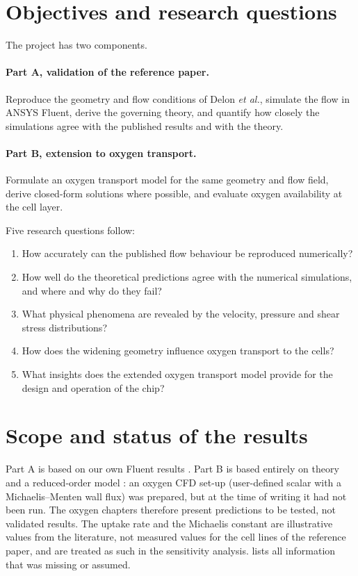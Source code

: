 \section{Objectives and research questions}

The project has two components.

\paragraph{Part A, validation of the reference paper.} Reproduce the geometry and flow conditions of Delon \emph{et al.}, simulate the flow in ANSYS Fluent, derive the governing theory, and quantify how closely the simulations agree with the published results and with the theory.

\paragraph{Part B, extension to oxygen transport.} Formulate an oxygen transport model for the same geometry and flow field, derive closed-form solutions where possible, and evaluate oxygen availability at the cell layer.

\noindent Five research questions follow:
\begin{enumerate}[label=\textbf{RQ\arabic*}]
\item How accurately can the published flow behaviour be reproduced numerically?
\item How well do the theoretical predictions agree with the numerical simulations, and where and why do they fail?
\item What physical phenomena are revealed by the velocity, pressure and shear stress distributions?
\item How does the widening geometry influence oxygen transport to the cells?
\item What insights does the extended oxygen transport model provide for the design and operation of the chip?
\end{enumerate}

\section{Scope and status of the results}

Part A is based on our own Fluent results \tagC. Part B is based entirely on theory and a reduced-order model \tagM: an oxygen CFD set-up (user-defined scalar with a Michaelis--Menten wall flux) was prepared, but at the time of writing it had not been run. The oxygen chapters therefore present predictions to be tested, not validated results. The uptake rate and the Michaelis constant are illustrative values from the literature, not measured values for the cell lines of the reference paper, and are treated as such in the sensitivity analysis.  lists all information that was missing or assumed.

